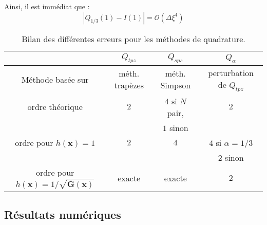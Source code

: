\begin{corollaire}
Ainsi, il est immédiat que :
\begin{equation}
|Q_{1/3}(1) - I(1) | = \mathcal{O}\left( \Delta \xi^4 \right)
\end{equation}
\end{corollaire}

















\begin{table}[ht]
\begin{center}
\begin{tabular}{c||c|c|c}
    & $Q_{tpz}$ & $Q_{sps}$ & $Q_{\alpha}$ \\
\hline
\hline
Méthode basée sur & méth. trapèzes & méth. Simpson & perturbation de $Q_{tpz}$ \\
\hline
ordre théorique & $2$ & $4$ si $N$ pair, & $2$ \\
                &     &      $1$ sinon   &     \\
\hline
ordre pour $h(\mathbf{x})=1$ &  $2$ & $4$ & $4$ si $\alpha=1/3$ \\
                             &      &     & $2$ sinon    \\
\hline
ordre pour $h(\mathbf{x})=1/\sqrt{\overline{\mathbf{G}}(\mathbf{x})}$ &  exacte & exacte & $2$
\end{tabular}
\end{center}
\caption{Bilan des différentes erreurs pour les méthodes de quadrature.}
\end{table}























\subsection{Résultats numériques} %

